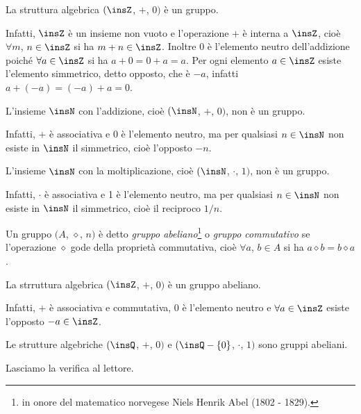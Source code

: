 \begin{exrig}
 \begin{esempio}
La struttura algebrica $(\insZ$, $+$, $0)$ è un gruppo.

Infatti, $\insZ$ è un insieme non vuoto e l'operazione $+$ è interna a $\insZ$, cioè $\forall m$, $n \in \insZ$ si ha $m+n \in \insZ$. Inoltre 0 è l'elemento neutro dell'addizione poiché $\forall a \in \insZ$ si ha $a+0=0+a=a$. Per ogni elemento $a \in \insZ$ esiste l'elemento simmetrico, detto opposto, che è $-a$, infatti $a + (-a) = (-a) + a = 0$.
 \end{esempio}

\begin{esempio}
L'insieme $\insN$ con l'addizione, cioè $(\insN$, $+$, $0)$, non è un gruppo.

Infatti, $+$ è associativa e 0 è l'elemento neutro, ma per qualsiasi $n \in \insN$ non esiste in $\insN$ il simmetrico, cioè l'opposto $-n$.
\end{esempio}

\begin{esempio}
L'insieme $\insN$ con la moltiplicazione, cioè $(\insN$, $\cdot$, $1)$, non è un gruppo.

Infatti, $\cdot$ è associativa e 1 è l'elemento neutro, ma per qualsiasi $n \in\insN$ non esiste in $\insN$ il simmetrico, cioè il reciproco $1/n$.
\end{esempio}
\end{exrig}

\begin{definizione}
Un gruppo $(A$, $\diamond$, $n)$ è detto \emph{gruppo abeliano}\footnote{in onore del matematico norvegese Niels Henrik Abel (1802 - 1829).} o \emph{gruppo commutativo} se l'operazione $\diamond$ gode della proprietà commutativa, cioè $\forall a$, $b \in A$ si ha $a\diamond b = b\diamond a$.
\end{definizione}

\begin{exrig}
 \begin{esempio}\label{es:z_gruppo_abeliano}
La strruttura algebrica $(\insZ$, $+$, $0)$ è un gruppo abeliano.

Infatti, $+$ è associativa
e commutativa, 0 è l'elemento neutro e $\forall a \in \insZ$ esiste l'opposto $-a\in\insZ$.
 \end{esempio}

 \begin{esempio}
 Le strutture algebriche $(\insQ$, $+$, $0)$ e $(\insQ - \{0\}$, $\cdot$, $1)$ sono gruppi abeliani.
 
 Lasciamo la verifica al lettore.
 \end{esempio}
\end{exrig}

